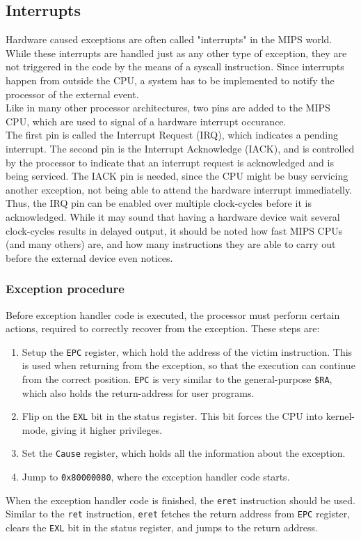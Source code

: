 \subsection{Interrupts}
\label{sec:exceptions_interrupts}
Hardware caused exceptions are often called "interrupts" in the MIPS world.
While these interrupts are handled just as any other type of exception, they
are not triggered in the code by the means of a syscall instruction. Since
interrupts happen from outside the CPU, a system has to be implemented to notify
the processor of the external event.\\
Like in many other processor architectures, two pins are added to the MIPS CPU,
which are used to signal of a hardware interrupt occurance\cite{cs_pitt:exceptions}.\\
The first pin is called the Interrupt Request (IRQ), which indicates a
pending interrupt. The second pin is the Interrupt Acknowledge (IACK), and is
controlled by the processor to indicate that an interrupt request is acknowledged
and is being serviced. The IACK pin is needed, since the CPU might be busy servicing
another exception, not being able to attend the hardware interrupt immediatelly.
Thus, the IRQ pin can be enabled over multiple clock-cycles before it is
acknowledged\cite{cs_pitt:exceptions}. While it may sound that having a hardware
device wait several clock-cycles results in delayed output, it should be noted
how fast MIPS CPUs (and many others) are, and how many instructions they are
able to carry out before the external device even notices.


\subsubsection{Exception procedure}
\label{sec:exception_procedure}
Before exception handler code is executed, the processor must perform certain
actions, required to correctly recover from the exception. These steps are\cite{see_mips_run}:
\begin{enumerate}
\item Setup the \texttt{EPC} register, which hold the address of the victim
instruction. This is used when returning from the exception, so that the
execution can continue from the correct position. \texttt{EPC} is very similar to the
general-purpose \texttt{\$RA}, which also holds the return-address for user
programs.
\item Flip on the \texttt{EXL} bit in the status register. This bit forces the
CPU into kernel-mode, giving it higher privileges.
\item Set the \texttt{Cause} register, which holds all the information about
the exception.
\item Jump to \texttt{0x80000080}, where the exception handler code starts.
\end{enumerate}
When the exception handler code is finished, the \texttt{eret} instruction should
be used. Similar to the \texttt{ret} instruction, \texttt{eret} fetches the return
address from \texttt{EPC} register, clears the \texttt{EXL} bit in the status
register, and jumps to the return address.


